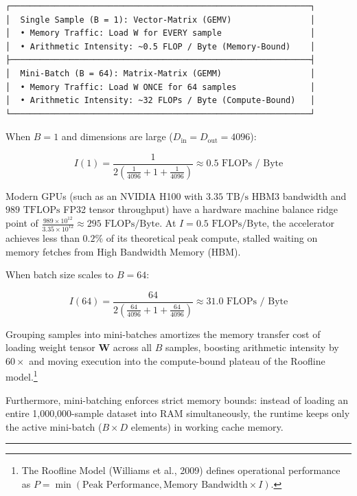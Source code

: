 \documentclass[
  letterpaper,
]{scrbook}
\begin{document}
\begin{verbatim}
┌─────────────────────────────────────────────────────────────┐
│  Single Sample (B = 1): Vector-Matrix (GEMV)                │
│  • Memory Traffic: Load W for EVERY sample                  │
│  • Arithmetic Intensity: ~0.5 FLOP / Byte (Memory-Bound)    │
├─────────────────────────────────────────────────────────────┤
│  Mini-Batch (B = 64): Matrix-Matrix (GEMM)                  │
│  • Memory Traffic: Load W ONCE for 64 samples               │
│  • Arithmetic Intensity: ~32 FLOPs / Byte (Compute-Bound)   │
└─────────────────────────────────────────────────────────────┘
\end{verbatim}

When \(B = 1\) and dimensions are large
(\(D_{\text{in}} = D_{\text{out}} = 4096\)):

\[I(1) = \frac{1}{2 \left( \frac{1}{4096} + 1 + \frac{1}{4096} \right)} \approx 0.5\text{ FLOPs / Byte}\]

Modern GPUs (such as an NVIDIA H100 with \(3.35\text{ TB/s}\) HBM3
bandwidth and \(989\text{ TFLOPs}\) FP32 tensor throughput) have a
hardware machine balance ridge point of
\(\frac{989 \times 10^{12}}{3.35 \times 10^{12}} \approx 295\text{ FLOPs/Byte}\).
At \(I = 0.5\text{ FLOPs/Byte}\), the accelerator achieves less than
\(0.2\%\) of its theoretical peak compute, stalled waiting on memory
fetches from High Bandwidth Memory (HBM).

When batch size scales to \(B = 64\):

\[I(64) = \frac{64}{2 \left( \frac{64}{4096} + 1 + \frac{64}{4096} \right)} \approx 31.0\text{ FLOPs / Byte}\]

Grouping samples into mini-batches amortizes the memory transfer cost of
loading weight tensor \(\mathbf{W}\) across all \(B\) samples, boosting
arithmetic intensity by \(60\times\) and moving execution into the
compute-bound plateau of the Roofline model.\footnote{The Roofline Model
  (Williams et al., 2009) defines operational performance as
  \(P = \min(\text{Peak Performance}, \text{Memory Bandwidth} \times I)\).}

Furthermore, mini-batching enforces strict memory bounds: instead of
loading an entire 1,000,000-sample dataset into RAM simultaneously, the
runtime keeps only the active mini-batch (\(B \times D\) elements) in
working cache memory.

\begin{center}\rule{0.5\linewidth}{0.5pt}\end{center}
\end{document}
